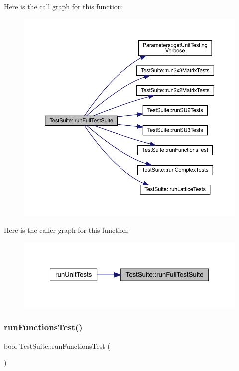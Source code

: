 Here is the call graph for this function\+:
\nopagebreak
\begin{figure}[H]
\begin{center}
\leavevmode
\includegraphics[width=350pt]{class_test_suite_a0fa7e788a1b1c235faa475c0d1aaa1e3_cgraph}
\end{center}
\end{figure}
Here is the caller graph for this function\+:
\nopagebreak
\begin{figure}[H]
\begin{center}
\leavevmode
\includegraphics[width=322pt]{class_test_suite_a0fa7e788a1b1c235faa475c0d1aaa1e3_icgraph}
\end{center}
\end{figure}
\mbox{\label{class_test_suite_af257c555a7fff6934523f80b9c59309c}} 
\subsubsection{\texorpdfstring{runFunctionsTest()}{runFunctionsTest()}}
{\footnotesize\ttfamily bool Test\+Suite\+::run\+Functions\+Test (\begin{DoxyParamCaption}{ }\end{DoxyParamCaption})}

